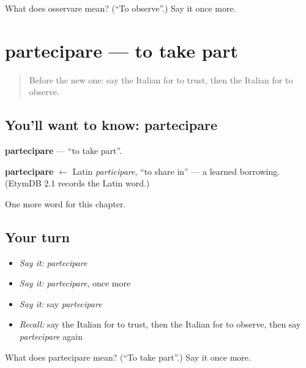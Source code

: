 \begin{tcolorbox}[breakable,colback=teal!4,colframe=teal!35!black,title={Before you move on}]
What does osservare mean? (\textquotedblleft{}To observe\textquotedblright{}.) Say it once more.
\end{tcolorbox}
\section[partecipare]{partecipare — to take part}

\label{lesson:IT-C180-partecipare}



\begin{quote}
Before the new one: say the Italian for to trust, then the Italian for to observe.
\end{quote}

\subsection*{You'll want to know: partecipare}
\textbf{partecipare} — \textquotedblleft{}to take part\textquotedblright{}.

\begin{cousinweb}
\textbf{partecipare} $\leftarrow$ Latin \emph{participare}, \textquotedblleft{}to share in\textquotedblright{} — a learned borrowing. (EtymDB 2.1 records the Latin word.)
\end{cousinweb}

\begin{grammarlens}[title={What you've built}]
One more word for this chapter.
\end{grammarlens}

\subsection*{Your turn}
\begin{itemize}
\raggedright
  \item \emph{Say it:} \emph{partecipare}
  \item \emph{Say it:} \emph{partecipare}, once more
  \item \emph{Say it:} say \emph{partecipare}
  \item \emph{Recall:} say the Italian for to trust, then the Italian for to observe, then say \emph{partecipare} again
\end{itemize}

\begin{tcolorbox}[breakable,colback=teal!4,colframe=teal!35!black,title={Before you move on}]
What does partecipare mean? (\textquotedblleft{}To take part\textquotedblright{}.) Say it once more.
\end{tcolorbox}
